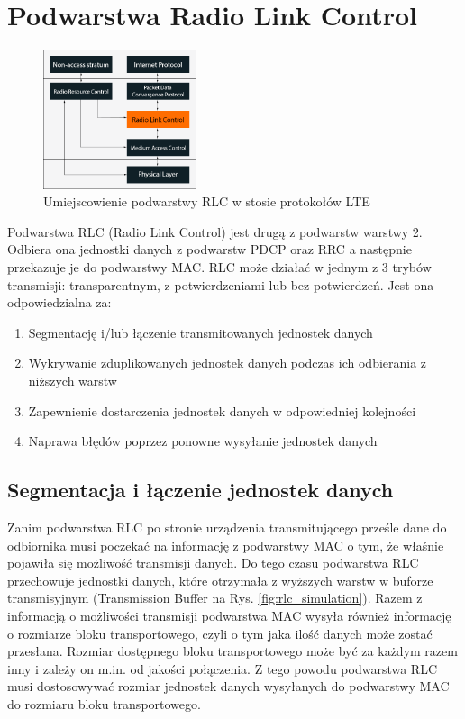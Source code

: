 \chapter{Podwarstwa Radio Link Control}
\label{cha:rlc}

\begin{figure}
	\centerline{\includegraphics[width=0.4\textwidth]{images/rlc_overview.png}}
	\caption{Umiejscowienie podwarstwy RLC w stosie protokołów LTE}
	\label{fig:rlc_overview}
\end{figure}

Podwarstwa RLC (Radio Link Control) jest drugą z podwarstw warstwy 2. Odbiera ona jednostki danych z podwarstw PDCP oraz RRC a następnie przekazuje je do podwarstwy MAC. RLC może działać w jednym z 3 trybów transmisji: transparentnym, z potwierdzeniami lub bez potwierdzeń. Jest ona odpowiedzialna za:

\begin{enumerate}
	\item Segmentację i/lub łączenie transmitowanych jednostek danych
	\item Wykrywanie zduplikowanych jednostek danych podczas ich odbierania z niższych warstw
	\item Zapewnienie dostarczenia jednostek danych w odpowiedniej kolejności
	\item Naprawa błędów poprzez ponowne wysyłanie jednostek danych
\end{enumerate}

\section{Segmentacja i łączenie jednostek danych}
\label{sec:segmentation}

Zanim podwarstwa RLC po stronie urządzenia transmitującego prześle dane do odbiornika musi poczekać na informację z podwarstwy MAC o tym, że właśnie pojawiła się możliwość transmisji danych. Do tego czasu podwarstwa RLC przechowuje jednostki danych, które otrzymała z wyższych warstw w buforze transmisyjnym (Transmission Buffer na Rys. \ref{fig:rlc_simulation}). Razem z informacją o możliwości transmisji podwarstwa MAC wysyła również informację o rozmiarze bloku transportowego, czyli o tym jaka ilość danych może zostać przesłana. Rozmiar dostępnego bloku transportowego może być za każdym razem inny i zależy on m.in. od jakości połączenia. Z tego powodu podwarstwa RLC musi dostosowywać rozmiar jednostek danych wysyłanych do podwarstwy MAC do rozmiaru bloku transportowego. \cite{Perez15}

